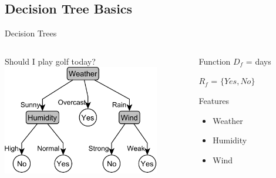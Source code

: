 \documentclass[14pt]{beamer}
\begin{document}
\subsection{Decision Tree Basics}
\begin{frame}{Decision Trees}
	\begin{columns}
		\begin{column}{2.7in}
			\centering
			Should I play golf today? \\
			\bigskip
			\includegraphics[width=2.7in]{play_golf}
		\end{column}
		\begin{column}{1.5in}
			\begin{block}{Function}
				$D_f$ = days
				
				$R_f$ = $\{\textit{Yes}, \textit{No}\}$
			\end{block}
			\bigskip
			\begin{block}{Features}
				\begin{itemize}
					\item Weather
					\item Humidity
					\item Wind
				\end{itemize}
			\end{block}
		\end{column}
	\end{columns}
\end{frame}
\end{document}
